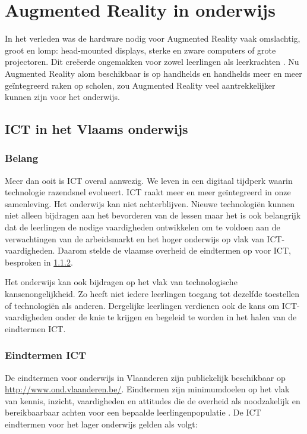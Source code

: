\documentclass[pdftex,a4paper,12pt,twoside]{report}
\begin{document}
\chapter{Augmented Reality in onderwijs}

In het verleden was de hardware nodig voor Augmented Reality vaak omslachtig, groot en lomp: head-mounted displays, sterke en zware computers of grote projectoren. Dit cre\"eerde ongemakken voor zowel leerlingen als leerkrachten \citep{kerawalla2006}. Nu Augmented Reality alom beschikbaar is op handhelds en handhelds meer en meer ge\"integreerd raken op scholen, zou Augmented Reality veel aantrekkelijker kunnen zijn voor het onderwijs. 

	\section{ICT in het Vlaams onderwijs }
		
	\subsection{Belang}
	Meer dan ooit is ICT overal aanwezig. We leven in een digitaal tijdperk waarin technologie razendsnel evolueert. ICT raakt meer en meer ge\"integreerd in onze samenleving. Het onderwijs kan niet achterblijven. Nieuwe technologi\"en kunnen niet alleen bijdragen aan het bevorderen van de lessen maar het is ook belangrijk dat de leerlingen de nodige vaardigheden ontwikkelen om te voldoen aan de verwachtingen van de arbeidsmarkt en het hoger onderwijs op vlak van ICT-vaardigheden. Daarom stelde de vlaamse overheid de eindtermen op voor ICT, besproken in \ref{sec:eindtermen}.
	
	Het onderwijs kan ook bijdragen op het vlak van technologische kansenongelijkheid. Zo heeft niet iedere leerlingen toegang tot dezelfde toestellen of technologiën als anderen. Dergelijke leerlingen verdienen ook de kans om ICT-vaardigheden onder de knie te krijgen en begeleid te worden in het halen van de eindtermen ICT.
		
	
  \subsection{Eindtermen ICT}
	\label{sec:eindtermen}

	De eindtermen voor onderwijs in Vlaanderen zijn publiekelijk beschikbaar op \\	\href{url}{http://www.ond.vlaanderen.be/}. Eindtermen zijn minimumdoelen op het vlak van kennis, inzicht, vaardigheden en attitudes die de overheid als noodzakelijk en bereikbaarbaar achten voor een bepaalde leerlingenpopulatie \citep{eindtermen}. De ICT eindtermen voor het lager onderwijs gelden als volgt: 
	
\end{document}
